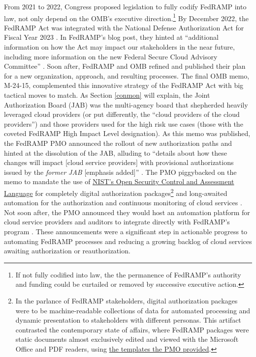 \documentclass{jdf}
\begin{document}
From 2021 to 2022, Congress proposed legislation to fully codify FedRAMP into law, not only depend on the OMB's executive direction.\footnote{If not fully codified into law, the the permanence of FedRAMP's authority and funding could be curtailed or removed by successive executive action.} By December 2022, the FedRAMP Act was integrated with the National Defense Authorization Act for Fiscal Year 2023 \cite{ndaa2023}. In FedRAMP's blog post, they hinted at ``additional information on how the Act may impact our stakeholders in the near future, including more information on the new Federal Secure Cloud Advisory Committee'' \citeyear{fedramp_blog_ndaa2023}. Soon after, FedRAMP and OMB refined and published their plan for a new organization, approach, and resulting processes. The final OMB memo, M-24-15, complemented this innovative strategy of the FedRAMP Act with big tactical moves to match. As Section \ref{conmon} will explain, the Joint Authorization Board (JAB) was the multi-agency board that shepherded heavily leveraged cloud providers (or put differently, the ``cloud providers of the cloud providers'') and those providers used for the high risk use cases (those with the coveted FedRAMP High Impact Level designation). As this memo was published, the FedRAMP PMO announced the rollout of new authorization paths and hinted at the dissolution of the JAB, alluding to ``details about how these changes will impact [cloud service providers] with provisional authorizations issued by the \textit{former JAB} [emphasis added]'' \citeyear{fedramp_blog_phase24}. The PMO piggybacked on the memo to mandate the use of \href{https://pages.nist.gov/OSCAL}{NIST's Open Security Control and Assessment Language} for completely digital authorization packages\footnote{In the parlance of FedRAMP stakeholders, digital authorization packages were to be machine-readable collections of data for automated processing and dynamic presentation to stakeholders with different personas. This artifact contrasted the contemporary state of affairs, where FedRAMP packages were static documents almost exclusively edited and viewed with the Microsoft Office and PDF readers, using \href{https://web.archive.org/web/20250524170225/https://www.fedramp.gov/rev5/documents-templates/}{the templates the PMO provided}.} and long-awaited automation for the authorization and continuous monitoring of cloud services \citeyear{fedramp_blog_phase24}. Not soon after, the PMO announced they would host an automation platform for cloud service providers and auditors to integrate directly with FedRAMP's program \citeyear{fedramp_blog_platform24}. These announcements were a significant step in actionable progress to automating FedRAMP processes and reducing a growing backlog of cloud services awaiting authorization or reauthorization.
\end{document}
